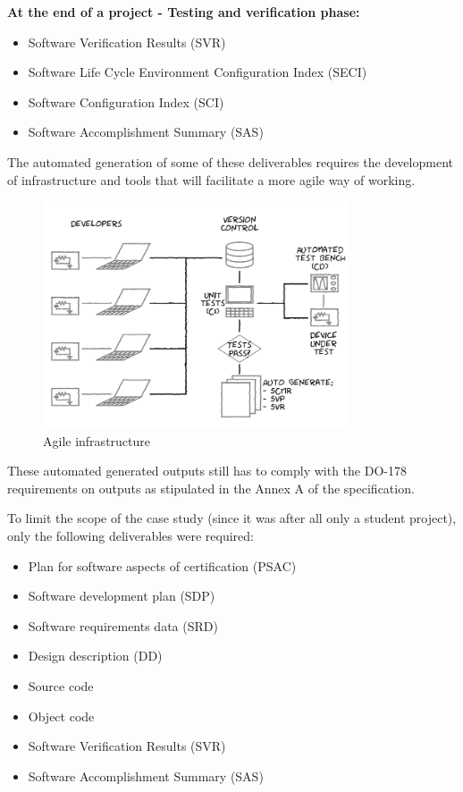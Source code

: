 \documentclass{sig-alternate-05-2015}
\begin{document}
\hfill \break
\textbf{At the end of a project - Testing and verification phase:}

\begin{itemize}
	\item Software Verification Results (SVR)
	\item Software Life Cycle Environment Configuration Index (SECI)
	\item Software Configuration Index (SCI)
	\item Software Accomplishment Summary (SAS)
\end{itemize} 

The automated generation of some of these deliverables requires the development of infrastructure and tools that will facilitate a more agile way of working.

\begin{figure}[t!]
	\centering 
	\includegraphics[width=90mm]{agile_setup.png}
	\caption{Agile infrastructure}
\end{figure}

These automated generated outputs still has to comply with the DO-178 requirements on outputs as stipulated in the Annex A of the specification.

To limit the scope of the case study (since it was after all only a student project), only the following deliverables were required:
\begin{itemize}
	\item Plan for software aspects of certification (PSAC)
	\item Software development plan (SDP)
	\item Software requirements data (SRD)
	\item Design description (DD)
	\item Source code
	\item Object code
	\item Software Verification Results (SVR)
	\item Software Accomplishment Summary (SAS)
\end{itemize}
\end{document}
